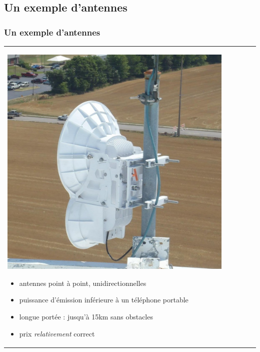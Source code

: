 \documentclass[handout]{beamer}
\begin{document}
	\subsection{Un exemple d'antennes}
		\begin{frame}
		\frametitle{Un exemple d'antennes}
		\begin{tabular}{l l}
			\begin{minipage}{0.4\textwidth}
				\begin{center}
					\includegraphics[width=0.9\textwidth]{images/airFiber.jpg}
				\end{center}
			\end{minipage}

			\begin{minipage}{0.6\textwidth}
				\begin{itemize}
					\item antennes point à point, unidirectionnelles
					\item puissance d'émission inférieure à un téléphone portable
					\item longue portée : jusqu'à 15km sans obstacles
					\item prix \textit{relativement} correct
				\end{itemize}
			\end{minipage}
			
		\end{tabular}
		\end{frame}
\end{document}
